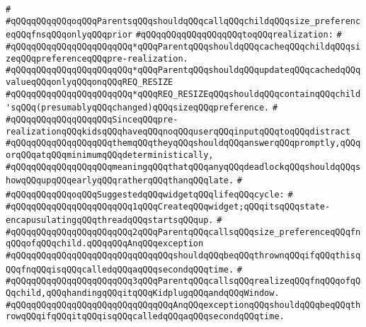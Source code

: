 \verb|#|\newline
\verb|#qQQqqQQqqQQqoqQQqParentsqQQqshouldqQQqcallqQQqchildqQQqsize_preferenceqQQqfnsqQQqonlyqQQqprior|\newline
\verb|#qQQqqQQqqQQqqQQqqQQqtoqQQqrealization:|\newline
\verb|#|\newline
\verb|#qQQqqQQqqQQqqQQqqQQqqQQq*qQQqParentqQQqshouldqQQqcacheqQQqchildqQQqsizeqQQqpreferenceqQQqpre-realization.|\newline
\verb|#qQQqqQQqqQQqqQQqqQQqqQQq*qQQqParentqQQqshouldqQQqupdateqQQqcachedqQQqvalueqQQqonlyqQQqonqQQqREQ_RESIZE|\newline
\verb|#qQQqqQQqqQQqqQQqqQQqqQQq*qQQqREQ_RESIZEqQQqshouldqQQqcontainqQQqchild'sqQQq(presumablyqQQqchanged)qQQqsizeqQQqpreference.|\newline
\verb|#|\newline
\verb|#qQQqqQQqqQQqqQQqqQQqSinceqQQqpre-realizationqQQqkidsqQQqhaveqQQqnoqQQquserqQQqinputqQQqtoqQQqdistract|\newline
\verb|#qQQqqQQqqQQqqQQqqQQqthemqQQqtheyqQQqshouldqQQqanswerqQQqpromptly,qQQqorqQQqatqQQqminimumqQQqdeterministically,|\newline
\verb|#qQQqqQQqqQQqqQQqqQQqmeaningqQQqthatqQQqanyqQQqdeadlockqQQqshouldqQQqshowqQQqupqQQqearlyqQQqratherqQQqthanqQQqlate.|\newline
\verb|#|\newline
\verb|#qQQqqQQqqQQqoqQQqSuggestedqQQqwidgetqQQqlifeqQQqcycle:|\newline
\verb|#|\newline
\verb|#qQQqqQQqqQQqqQQqqQQqqQQq1qQQqCreateqQQqwidget;qQQqitsqQQqstate-encapusulatingqQQqthreadqQQqstartsqQQqup.|\newline
\verb|#|\newline
\verb|#qQQqqQQqqQQqqQQqqQQqqQQq2qQQqParentqQQqcallsqQQqsize_preferenceqQQqfnqQQqofqQQqchild.qQQqqQQqAnqQQqexception|\newline
\verb|#qQQqqQQqqQQqqQQqqQQqqQQqqQQqqQQqshouldqQQqbeqQQqthrownqQQqifqQQqthisqQQqfnqQQqisqQQqcalledqQQqaqQQqsecondqQQqtime.|\newline
\verb|#|\newline
\verb|#qQQqqQQqqQQqqQQqqQQqqQQq3qQQqParentqQQqcallsqQQqrealizeqQQqfnqQQqofqQQqchild,qQQqhandingqQQqitqQQqKidplugqQQqandqQQqWindow.|\newline
\verb|#qQQqqQQqqQQqqQQqqQQqqQQqqQQqqQQqAnqQQqexceptionqQQqshouldqQQqbeqQQqthrowqQQqifqQQqitqQQqisqQQqcalledqQQqaqQQqsecondqQQqtime.|\newline
